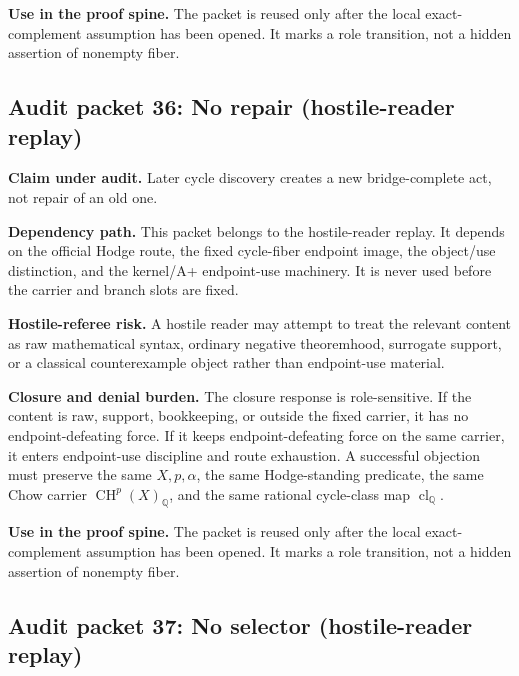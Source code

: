 \documentclass[11pt]{article}
\newcommand{\QQ}{\mathbb{Q}}
\newcommand{\CH}{\operatorname{CH}}
\newcommand{\clQ}{\operatorname{cl}_{\QQ}}
\begin{document}
\par\noindent\textbf{Use in the proof spine.} The packet is reused only after the local exact-complement assumption has been opened. It marks a role transition, not a hidden assertion of nonempty fiber.


\subsection{Audit packet 36: No repair (hostile-reader replay)}


\par\noindent\textbf{Claim under audit.} Later cycle discovery creates a new bridge-complete act, not repair of an old one.


\par\noindent\textbf{Dependency path.} This packet belongs to the hostile-reader replay. It depends on the official Hodge route, the fixed cycle-fiber endpoint image, the object/use distinction, and the kernel/A+ endpoint-use machinery. It is never used before the carrier and branch slots are fixed.


\par\noindent\textbf{Hostile-referee risk.} A hostile reader may attempt to treat the relevant content as raw mathematical syntax, ordinary negative theoremhood, surrogate support, or a classical counterexample object rather than endpoint-use material.


\par\noindent\textbf{Closure and denial burden.} The closure response is role-sensitive. If the content is raw, support, bookkeeping, or outside the fixed carrier, it has no endpoint-defeating force. If it keeps endpoint-defeating force on the same carrier, it enters endpoint-use discipline and route exhaustion. A successful objection must preserve the same $X,p,\alpha$, the same Hodge-standing predicate, the same Chow carrier $\CH^p(X)_\QQ$, and the same rational cycle-class map $\clQ$.


\par\noindent\textbf{Use in the proof spine.} The packet is reused only after the local exact-complement assumption has been opened. It marks a role transition, not a hidden assertion of nonempty fiber.


\subsection{Audit packet 37: No selector (hostile-reader replay)}
\end{document}
